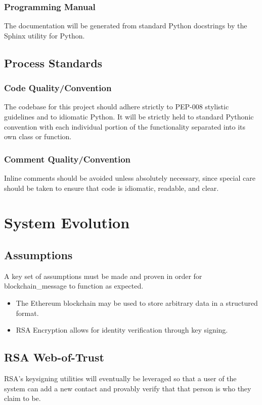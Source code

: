 \documentclass[titlepage]{report}
\begin{document}
\subsubsection{Programming Manual}
The documentation will be generated from standard Python docstrings by the Sphinx utility for Python.

\subsection{Process Standards}
\subsubsection{Code Quality/Convention}
The codebase for this project should adhere strictly to PEP-008 stylistic guidelines and to idiomatic Python. It will be strictly held to standard Pythonic convention with each individual portion of the functionality separated into its own class or function.

\subsubsection{Comment Quality/Convention}
Inline comments should be avoided unless absolutely necessary, since special care should be taken to ensure that code is idiomatic, readable, and clear.

\section{System Evolution}
\subsection{Assumptions}
A key set of assumptions must be made and proven in order for blockchain\_message to function as expected.
\begin{itemize}
\item The Ethereum blockchain may be used to store arbitrary data in a structured format.
\item RSA Encryption allows for identity verification through key signing.
\end{itemize}

\subsection{RSA Web-of-Trust}
RSA's keysigning utilities will eventually be leveraged so that a user of the system can add a new contact and provably verify that that person is who they claim to be.
\end{document}
